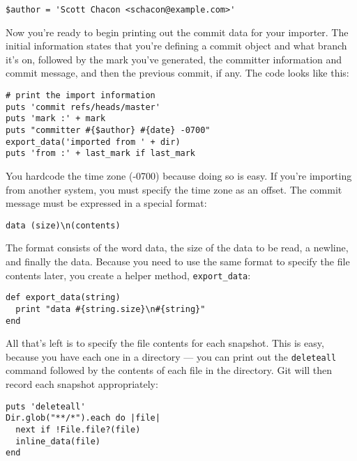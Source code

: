 \documentclass[a4paper]{book}
\begin{document}
\begin{shaded}\begin{verbatim}
$author = 'Scott Chacon <schacon@example.com>'
\end{verbatim}\end{shaded}

Now you're ready to begin printing out the commit data for your importer. The initial information states that you're defining a commit object and what branch it's on, followed by the mark you've generated, the committer information and commit message, and then the previous commit, if any. The code looks like this:

\begin{shaded}\begin{verbatim}
# print the import information
puts 'commit refs/heads/master'
puts 'mark :' + mark
puts "committer #{$author} #{date} -0700"
export_data('imported from ' + dir)
puts 'from :' + last_mark if last_mark
\end{verbatim}\end{shaded}

You hardcode the time zone (-0700) because doing so is easy. If you're importing from another system, you must specify the time zone as an offset. The commit message must be expressed in a special format:

\begin{shaded}\begin{verbatim}
data (size)\n(contents)
\end{verbatim}\end{shaded}

The format consists of the word data, the size of the data to be read, a newline, and finally the data. Because you need to use the same format to specify the file contents later, you create a helper method, \texttt{export\_data}:

\begin{shaded}\begin{verbatim}
def export_data(string)
  print "data #{string.size}\n#{string}"
end
\end{verbatim}\end{shaded}

All that's left is to specify the file contents for each snapshot. This is easy, because you have each one in a directory --- you can print out the \texttt{deleteall} command followed by the contents of each file in the directory. Git will then record each snapshot appropriately:

\begin{shaded}\begin{verbatim}
puts 'deleteall'
Dir.glob("**/*").each do |file|
  next if !File.file?(file)
  inline_data(file)
end
\end{verbatim}\end{shaded}
\end{document}
